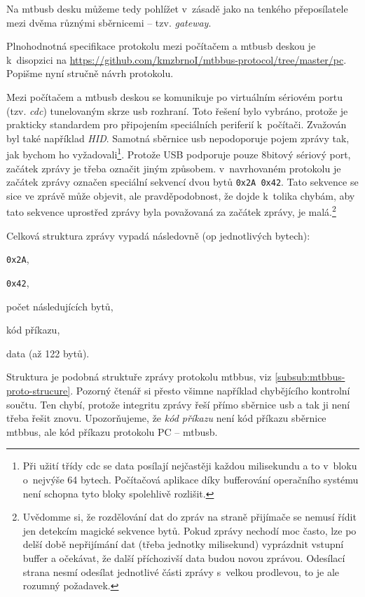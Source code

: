 Na \gls{mtbusb} desku můžeme tedy pohlížet v~zásadě jako na tenkého
přeposílatele mezi dvěma různými sběrnicemi – tzv. \textit{gateway}.

Plnohodnotná specifikace protokolu mezi počítačem a \gls{mtbusb} deskou je
k~disopzici na \url{https://github.com/kmzbrnoI/mtbbus-protocol/tree/master/pc}.
Popišme nyní stručně návrh protokolu.

Mezi počítačem a \gls{mtbusb} deskou se komunikuje po virtuálním sériovém portu
(tzv. \textit{\gls{cdc}}) tunelovaným skrze \gls{usb} rozhraní. Toto řešení bylo vybráno,
protože je prakticky standardem pro připojením speciálních periferií k~počítači.
Zvažován byl také například \textit{HID}. Samotná sběrnice \gls{usb}
nepodoporuje pojem zprávy tak, jak bychom ho vyžadovali\footnote{Při užití třídy \gls{cdc}
se data posílají nejčastěji každou milisekundu a to v~bloku o~nejvýše 64 bytech.
Počítačová aplikace díky bufferování operačního systému není schopna tyto bloky
spolehlivě rozlišit.}. Protože USB podporuje pouze 8bitový sériový port, začátek
zprávy je třeba označit jiným způsobem. v~navrhovaném protokolu je začátek zprávy
označen speciální sekvencí dvou bytů \texttt{0x2A 0x42}. Tato sekvence se sice
ve zprávě může objevit, ale pravděpodobnost, že dojde k~tolika chybám, aby
tato sekvence uprostřed zprávy byla považovaná za začátek zprávy, je
malá.\footnote{Uvědomme si, že rozdělování dat do zpráv na straně přijímače
se nemusí řídit jen detekcím magické sekvence bytů. Pokud zprávy nechodí moc
často, lze po delší době nepřijímání dat (třeba jednotky milisekund) vyprázdnit
vstupní buffer a očekávat, že další příchozivší data budou novou zprávou. Odesílací
strana nesmí odesílat jednotlivé části zprávy s~velkou prodlevou, to je ale
rozumný požadavek.}

Celková struktura zprávy vypadá následovně (op jednotlivých bytech):

\begin{compactenum}
\item \texttt{0x2A},
\item \texttt{0x42},
\item počet následujících bytů,
\item kód příkazu,
\item data (až 122 bytů).
\end{compactenum}

Struktura je podobná struktuře zprávy protokolu \gls{mtbbus}, viz
\ref{subsub:mtbbus-proto-strucure}. Pozorný čtenář si přesto všimne například
chybějícího kontrolní součtu. Ten chybí, protože integritu zprávy řeší přímo
sběrnice \gls{usb} a tak ji není třeba řešit znovu. Upozorňujeme, že
\textit{kód příkazu} není kód příkazu sběrnice \gls{mtbbus}, ale kód příkazu
protokolu PC – \gls{mtbusb}.

